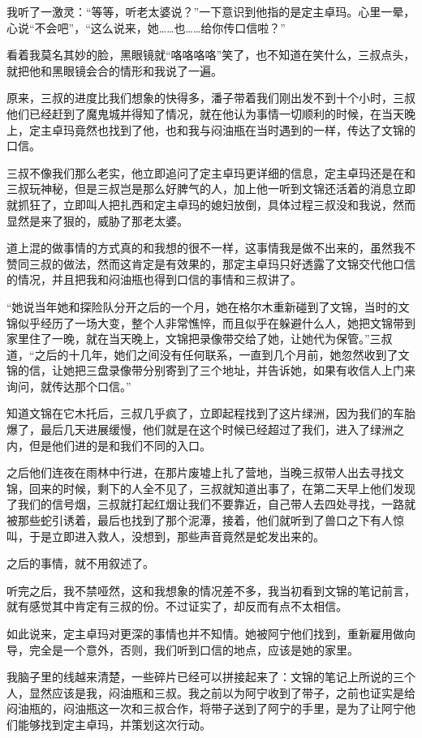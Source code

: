 我听了一激灵：“等等，听老太婆说？”一下意识到他指的是定主卓玛。心里一晕，心说“不会吧”，“这么说来，她……也……给你传口信啦？”

看着我莫名其妙的脸，黑眼镜就“咯咯咯咯”笑了，也不知道在笑什么，三叔点头，就把他和黑眼镜会合的情形和我说了一遍。

原来，三叔的进度比我们想象的快得多，潘子带着我们刚出发不到十个小时，三叔他们已经赶到了魔鬼城并得知了情况，就在他认为事情一切顺利的时候，在当天晚上，定主卓玛竟然也找到了他，也和我与闷油瓶在当时遇到的一样，传达了文锦的口信。

三叔不像我们那么老实，他立即追问了定主卓玛更详细的信息，定主卓玛还是在和三叔玩神秘，但是三叔岂是那么好脾气的人，加上他一听到文锦还活着的消息立即就抓狂了，立即叫人把扎西和定主卓玛的媳妇放倒，具体过程三叔没和我说，然而显然是来了狠的，威胁了那老太婆。

道上混的做事情的方式真的和我想的很不一样，这事情我是做不出来的，虽然我不赞同三叔的做法，然而这肯定是有效果的，那定主卓玛只好透露了文锦交代他口信的情况，并且把我和闷油瓶也得到口信的事情和三叔讲了。

“她说当年她和探险队分开之后的一个月，她在格尔木重新碰到了文锦，当时的文锦似乎经历了一场大变，整个人非常憔悴，而且似乎在躲避什么人，她把文锦带到家里住了一晚，就在当天晚上，文锦把录像带交给了她，让她代为保管。”三叔道，“之后的十几年，她们之间没有任何联系，一直到几个月前，她忽然收到了文锦的信，让她把三盘录像带分别寄到了三个地址，并告诉她，如果有收信人上门来询问，就传达那个口信。”

知道文锦在它木托后，三叔几乎疯了，立即起程找到了这片绿洲，因为我们的车胎爆了，最后几天进展缓慢，他们就是在这个时候已经超过了我们，进入了绿洲之内，但是他们进的是和我们不同的入口。

之后他们连夜在雨林中行进，在那片废墟上扎了营地，当晚三叔带人出去寻找文锦，回来的时候，剩下的人全不见了，三叔就知道出事了，在第二天早上他们发现了我们的信号烟，三叔就打起红烟让我们不要靠近，自己带人去四处寻找，一路就被那些蛇引诱着，最后也找到了那个泥潭，接着，他们就听到了兽口之下有人惊叫，于是立即进入救人，没想到，那些声音竟然是蛇发出来的。

之后的事情，就不用叙述了。

听完之后，我不禁哑然，这和我想象的情况差不多，我当初看到文锦的笔记前言，就有感觉其中肯定有三叔的份。不过证实了，却反而有点不太相信。

如此说来，定主卓玛对更深的事情也并不知情。她被阿宁他们找到，重新雇用做向导，完全是一个意外，否则，我们听到口信的地点，应该是她的家里。

我脑子里的线越来清楚，一些碎片已经可以拼接起来了：文锦的笔记上所说的三个人，显然应该是我，闷油瓶和三叔。我之前以为阿宁收到了带子，之前也证实是给闷油瓶的，闷油瓶这一次和三叔合作，将带子送到了阿宁的手里，是为了让阿宁他们能够找到定主卓玛，并策划这次行动。

